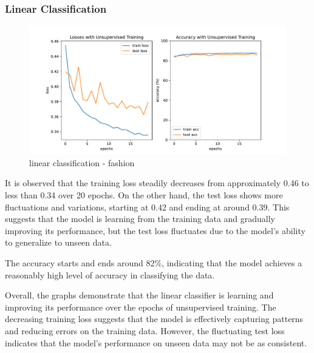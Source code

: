 \documentclass{midl} %
\begin{document}
\subsubsection{Linear Classification}
\begin{figure}[H]
  \centering
  \includegraphics[width=1.2\textwidth]{linear_classif_fashion.pdf}
  \caption{linear classification - fashion}
  \label{fig:linear classification - fashion}
\end{figure}
It is observed that the training loss steadily decreases from approximately 0.46 to less than 0.34 over 20 epochs. On the other hand, the test loss shows more fluctuations and variations, starting at 0.42 and ending at around 0.39. This suggests that the model is learning from the training data and gradually improving its performance, but the test loss fluctuates due to the model's ability to generalize to unseen data.

The accuracy starts and ends around 82\%, indicating that the model achieves a reasonably high level of accuracy in classifying the data.

Overall, the graphs demonstrate that the linear classifier is learning and improving its performance over the epochs of unsupervised training. The decreasing training loss suggests that the model is effectively capturing patterns and reducing errors on the training data. However, the fluctuating test loss indicates that the model's performance on unseen data may not be as consistent. 
\end{document}
